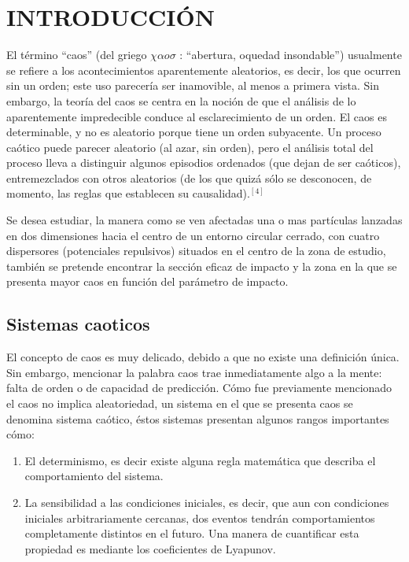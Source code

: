 \documentclass[11pt,letterpaper,twocolumn]{article}
\begin{document}
\section*{\normalsize{INTRODUCCIÓN}} 
El término “caos” (del griego \textit{$\chi\alpha o  \sigma$} : “abertura, oquedad insondable”) usualmente se refiere a los acontecimientos aparentemente aleatorios, es decir, los que ocurren sin un orden; este uso parecería ser inamovible, al menos a primera vista. Sin embargo, la teoría del caos se centra en la noción de que el análisis de lo aparentemente impredecible conduce al esclarecimiento de un orden. El caos es determinable, y no es aleatorio porque tiene un orden subyacente. Un proceso caótico puede parecer aleatorio (al azar, sin orden), pero el análisis total del proceso lleva a distinguir algunos episodios ordenados (que dejan de ser caóticos), entremezclados con otros aleatorios (de los que quizá sólo se desconocen, de momento, las reglas que establecen su causalidad).$^{[4]}$\\
\par 
Se desea estudiar, la manera como se ven afectadas una o mas partículas lanzadas en dos dimensiones hacia el centro de un entorno circular cerrado, con cuatro dispersores (potenciales repulsivos) situados en el centro de la zona de estudio, también se pretende encontrar la sección eficaz de impacto y la zona en la que se presenta mayor caos en función del parámetro de impacto.
\subsection*{Sistemas caoticos}
El concepto de caos es muy delicado, debido a que no existe una definición única. Sin embargo, mencionar la palabra caos trae inmediatamente algo a la mente: falta de orden o de capacidad de predicción. Cómo fue previamente mencionado el caos no implica aleatoriedad, un sistema en el que se presenta caos se denomina sistema caótico, éstos sistemas presentan algunos rangos importantes cómo:
\begin{enumerate}
\item El determinismo, es decir existe alguna regla matemática que describa el comportamiento del sistema. 
\item La sensibilidad a las condiciones iniciales, es decir, que aun con condiciones iniciales arbitrariamente cercanas, dos eventos tendrán comportamientos completamente distintos en el futuro. Una manera de cuantificar esta propiedad es mediante los coeficientes de Lyapunov. 
\end{enumerate}
\par 
\end{document}
